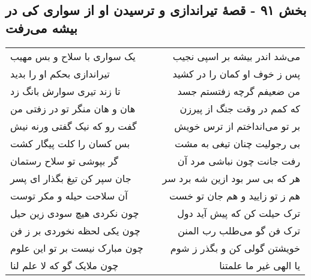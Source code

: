 \begin{center}
\section*{بخش ۹۱ - قصهٔ تیراندازی و ترسیدن او از سواری کی در بیشه می‌رفت}
\label{sec:sh091}
\begin{longtable}{l p{0.5cm} r}
یک سواری با سلاح و بس مهیب
&&
می‌شد اندر بیشه بر اسپی نجیب
\\
تیراندازی بحکم او را بدید
&&
پس ز خوف او کمان را در کشید
\\
تا زند تیری سوارش بانگ زد
&&
من ضعیفم گرچه زفتستم جسد
\\
هان و هان منگر تو در زفتی من
&&
که کمم در وقت جنگ از پیرزن
\\
گفت رو که نیک گفتی ورنه نیش
&&
بر تو می‌انداختم از ترس خویش
\\
بس کسان را کلت پیگار کشت
&&
بی رجولیت چنان تیغی به مشت
\\
گر بپوشی تو سلاح رستمان
&&
رفت جانت چون نباشی مرد آن
\\
جان سپر کن تیغ بگذار ای پسر
&&
هر که بی سر بود ازین شه برد سر
\\
آن سلاحت حیله و مکر توست
&&
هم ز تو زایید و هم جان تو خست
\\
چون نکردی هیچ سودی زین حیل
&&
ترک حیلت کن که پیش آید دول
\\
چون یکی لحظه نخوردی بر ز فن
&&
ترک فن گو می‌طلب رب المنن
\\
چون مبارک نیست بر تو این علوم
&&
خویشتن گولی کن و بگذر ز شوم
\\
چون ملایک گو که لا علم لنا
&&
یا الهی غیر ما علمتنا
\\
\end{longtable}
\end{center}
